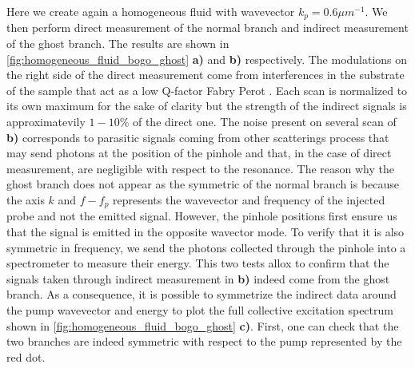 Here we create again a homogeneous fluid with wavevector $k_p =0.6 \mu m^{-1}$. We then 
perform direct measurement of the normal branch and indirect measurement of the ghost branch. The results are shown in \autoref{fig:homogeneous_fluid_bogo_ghost} \textbf{a)} and \textbf{\textbf{b)}} respectively.  The modulations on the right side of the direct measurement come from interferences in the substrate of the sample
that act as a low Q-factor Fabry Perot \cite{claude_phd}. Each scan is normalized to its own maximum for the sake of clarity but 
the strength of the indirect signals is approximatevily $1-10\%$ of the direct one. The noise present on several scan of \textbf{b)} corresponds to parasitic signals coming from other scatterings process that may send photons at the position of the pinhole and that, in the case of direct measurement, are negligible with respect to the resonance. The reason why the ghost branch does not appear as the symmetric of the normal branch 
is because the axis $k$ and $f-f_p$ represents the wavevector and frequency of the injected probe and not the emitted signal. However, the pinhole positions first ensure us that the signal is emitted in the opposite wavector mode. To verify that it is also symmetric in frequency, we send the photons collected through the pinhole 
into a spectrometer to measure their energy. This two tests allox to confirm that the signals taken through indirect measurement in \textbf{\textbf{b)}} indeed come from the ghost branch. As a consequence, it is possible  to symmetrize the indirect data around the pump wavevector and energy to plot the full collective excitation spectrum shown in \autoref{fig:homogeneous_fluid_bogo_ghost} \textbf{c)}. First, one can check that the two branches 
are indeed symmetric with respect to the pump represented by the red dot.
